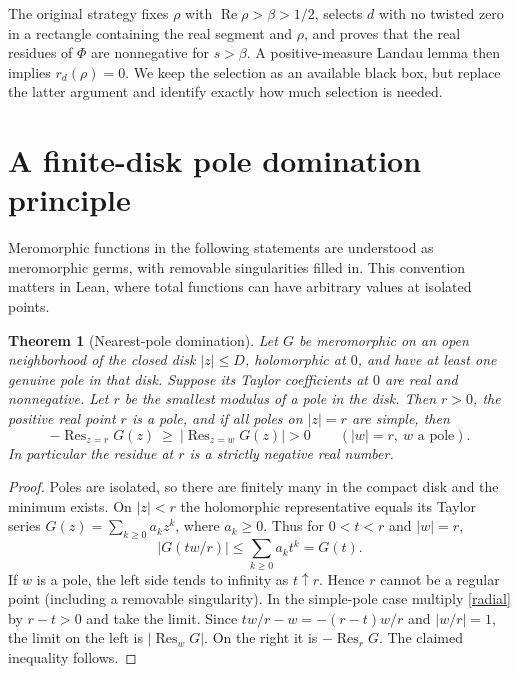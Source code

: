 \documentclass[11pt]{article}
\newtheorem{theorem}{Theorem}[section]
\theoremstyle{remark}\newtheorem{remark}[theorem]{Remark}
\newcommand{\res}{\operatorname{Res}}\newcommand{\ord}{\operatorname{ord}}
\newcommand{\Rea}{\operatorname{Re}}\newcommand{\abs}[1]{\left|#1\right|}
\begin{document}
The original strategy fixes $\rho$ with $\Rea\rho>\beta>1/2$, selects $d$ with no twisted zero in a rectangle containing the real segment and $\rho$, and proves that the real residues of $\Phi$ are nonnegative for $s>\beta$. A positive-measure Landau lemma then implies $r_d(\rho)=0$. We keep the selection as an available black box, but replace the latter argument and identify exactly how much selection is needed.

\section{A finite-disk pole domination principle}\label{sec:disk}
Meromorphic functions in the following statements are understood as meromorphic germs, with removable singularities filled in. This convention matters in Lean, where total functions can have arbitrary values at isolated points.

\begin{theorem}[Nearest-pole domination]\label{thm:pole}
Let $G$ be meromorphic on an open neighborhood of the closed disk $|z|\le D$, holomorphic at $0$, and have at least one genuine pole in that disk. Suppose its Taylor coefficients at $0$ are real and nonnegative. Let $r$ be the smallest modulus of a pole in the disk. Then $r>0$, the positive real point $r$ is a pole, and if all poles on $|z|=r$ are simple, then
\begin{equation}\label{dom}
 -\res_{z=r}G(z)\ \ge\ \abs{\res_{z=w}G(z)}>0
 \qquad (|w|=r,\ w\text{ a pole}).
\end{equation}
In particular the residue at $r$ is a strictly negative real number.
\end{theorem}
\begin{proof}
Poles are isolated, so there are finitely many in the compact disk and the minimum exists. On $|z|<r$ the holomorphic representative equals its Taylor series $G(z)=\sum_{k\ge0}a_kz^k$, where $a_k\ge0$. Thus for $0<t<r$ and $|w|=r$,
\begin{equation}\label{radial}
 \abs{G(tw/r)}\le\sum_{k\ge0}a_kt^k=G(t).
\end{equation}
If $w$ is a pole, the left side tends to infinity as $t\uparrow r$. Hence $r$ cannot be a regular point (including a removable singularity). In the simple-pole case multiply \eqref{radial} by $r-t>0$ and take the limit. Since $tw/r-w=-(r-t)w/r$ and $|w/r|=1$, the limit on the left is $|\res_wG|$. On the right it is $-\res_rG$. The claimed inequality follows.
\end{proof}
\end{document}
